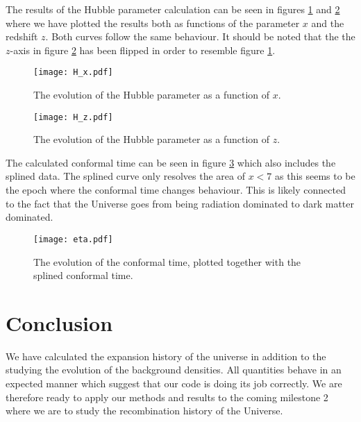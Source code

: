 \documentclass[a4paper, 10pt, reqno]{amsart}
\begin{document}
The results of the Hubble parameter calculation can be seen in figures
\ref{fig: H_x} and \ref{fig: H_z} where we have plotted the results
both as functions of the parameter $x$ and the redshift $z$. Both
curves follow the same behaviour. It should be noted that the the
$z$-axis in figure \ref{fig: H_z} has been flipped in order to resemble
figure \ref{fig: H_x}.

\begin{figure}
    \centering
    \texttt{[image: H\_x.pdf]}
    \caption{The evolution of the Hubble parameter as a function of
    $x$.}
    \label{fig: H_x}
\end{figure}

\begin{figure}
    \centering
    \texttt{[image: H\_z.pdf]}
    \caption{The evolution of the Hubble parameter as a function of
    $z$.}
    \label{fig: H_z}
\end{figure}

The calculated conformal time can be seen in figure \ref{fig: eta}
which also includes the splined data. The splined curve only resolves
the area of $x < 7$ as this seems to be the epoch where the conformal
time changes behaviour. This is likely connected to the fact that the
Universe goes from being radiation dominated to dark matter dominated.

\begin{figure}
    \centering
    \texttt{[image: eta.pdf]}
    \caption{The evolution of the conformal time, plotted together with
    the splined conformal time.}
    \label{fig: eta}
\end{figure}

\section{Conclusion}
We have calculated the expansion history of the universe in addition to
the studying the evolution of the background densities. All quantities
behave in an expected manner which suggest that our code is doing its
job correctly. We are therefore ready to apply our methods and results
to the coming milestone 2 where we are to study the recombination
history of the Universe.

\nocite{*}
{}

\end{document}
